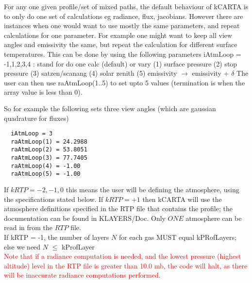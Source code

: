 \documentclass[12pt]{article}
\newcommand{\kc}{\textsf{kCARTA}\xspace}
\begin{document}
{\medskip
For any one given profile/set of mixed paths, the default behaviour of \kc is to only do one set
of calculations eg radiance, flux, jacobians. However there are instances when one would want
to use mostly the same parameters, and repeat calculations for one parameter. For example one
might want to keep all view angles and emissivity the same, but repeat the calculation for
different surface temperatures. This can be done by using the following parameters \newline
iAtmLoop = -1,1,2,3,4 : stand for do one calc (default) or vary \newline
  (1) surface pressure (2) stop pressure (3) satzen/scanang (4) solar zenith
  (5) emissivity $\rightarrow$ emissivity + $\delta$ \newline
The user can then use raAtmLoop(1..5) to set upto 5 values (termination is when the array
value is less than 0).

So for example the following sets three view angles (which are gaussian quadrature for fluxes)
\newline
\begin{verbatim}
  iAtmLoop = 3
  raAtmLoop(1) = 24.2988
  raAtmLoop(2) = 53.8051
  raAtmLoop(3) = 77.7405
  raAtmLoop(4) = -1.00
  raAtmLoop(5) = -1.00
\end{verbatim}

\medskip
If $kRTP = -2,-1,0$ this means the user will be defining the atmosphere, 
using the specifications stated below. If $kRTP = +1$ then \kc will use the 
atmosphere definitions specified in the RTP file that contains the profile; 
the documentation can be found in KLAYERS/Doc. Only $ONE$ atmosphere can
be read in from the $RTP$ file. \\
If kRTP = -1, the number of layers $N$ for each gas MUST equal kPRofLayers; 
else we need $N$ $\le$ kProfLayer\\
\textcolor{red}
{Note that if a radiance computation is needed,
and the lowest pressure (highest altitude) level in the RTP file is greater 
than 10.0 mb, the code will halt, as there will be inaccurate radiance
computations performed.}

\medskip
}
\end{document}
